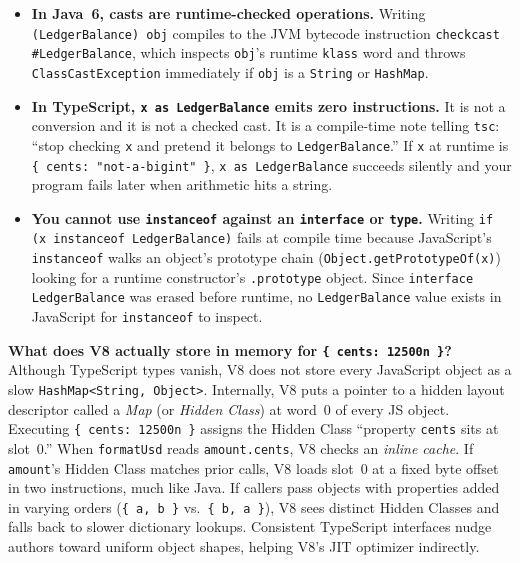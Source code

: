 \begin{itemize}
  \item \textbf{In Java~6, casts are runtime-checked operations.} Writing \texttt{(LedgerBalance) obj} compiles to the JVM bytecode instruction \texttt{checkcast \#LedgerBalance}, which inspects \texttt{obj}'s runtime \texttt{klass} word and throws \texttt{ClassCastException} immediately if \texttt{obj} is a \texttt{String} or \texttt{HashMap}.
  \item \textbf{In TypeScript, \texttt{x as LedgerBalance} emits zero instructions.} It is not a conversion and it is not a checked cast. It is a compile-time note telling \texttt{tsc}: ``stop checking \texttt{x} and pretend it belongs to \texttt{LedgerBalance}.'' If \texttt{x} at runtime is \texttt{\{ cents: "not-a-bigint" \}}, \texttt{x as LedgerBalance} succeeds silently and your program fails later when arithmetic hits a string.
  \item \textbf{You cannot use \texttt{instanceof} against an \texttt{interface} or \texttt{type}.} Writing \texttt{if (x instanceof LedgerBalance)} fails at compile time because JavaScript's \texttt{instanceof} walks an object's prototype chain (\texttt{Object.\allowbreak{}getPrototypeOf(x)}) looking for a runtime constructor's \texttt{.prototype} object. Since \texttt{interface LedgerBalance} was erased before runtime, no \texttt{LedgerBalance} value exists in JavaScript for \texttt{instanceof} to inspect.
\end{itemize}

\begin{happeningbox}
\textbf{What does V8 actually store in memory for \texttt{\{ cents: 12500n \}}?} Although TypeScript types vanish, V8 does not store every JavaScript object as a slow \texttt{HashMap<String, Object>}. Internally, V8 puts a pointer to a hidden layout descriptor called a \emph{Map} (or \emph{Hidden Class}) at word~0 of every JS object. Executing \texttt{\{ cents: 12500n \}} assigns the Hidden Class ``property \texttt{cents} sits at slot~0.'' When \texttt{formatUsd} reads \texttt{amount.cents}, V8 checks an \emph{inline cache}. If \texttt{amount}'s Hidden Class matches prior calls, V8 loads slot~0 at a fixed byte offset in two instructions, much like Java. If callers pass objects with properties added in varying orders (\texttt{\{ a, b \}} vs.\ \texttt{\{ b, a \}}), V8 sees distinct Hidden Classes and falls back to slower dictionary lookups. Consistent TypeScript interfaces nudge authors toward uniform object shapes, helping V8's JIT optimizer indirectly.
\end{happeningbox}

